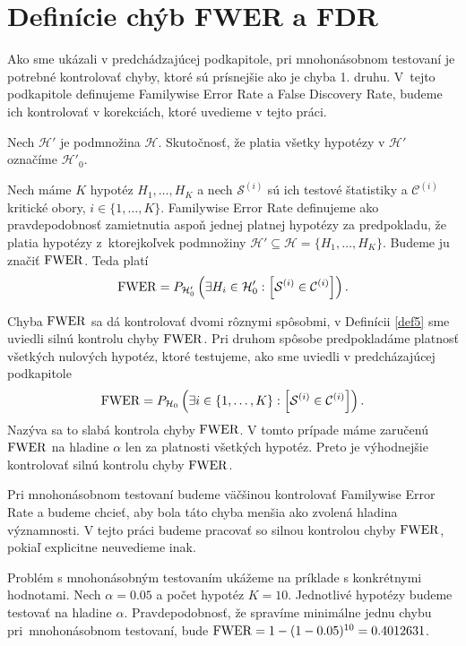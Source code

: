\section{Definície chýb FWER a FDR}

Ako sme ukázali v predchádzajúcej podkapitole, pri mnohonásobnom testovaní 
je potrebné kontrolovať chyby, ktoré sú prísnejšie ako je chyba 1. druhu. 
V~tejto podkapitole definujeme Familywise Error Rate a False Discovery Rate, 
budeme ich kontrolovať v korekciách, ktoré uvedieme v tejto práci. 

Nech $\mathcal{H}'$ je podmnožina $\mathcal{H}$. 
Skutočnosť, že platia všetky hypotézy v $\mathcal{H}'$ označíme ${\mathcal{H}}'_0$. 

\begin{definicia}\label{def5} 
  Nech máme $K$ hypotéz $H_1, \dots, H_K$ a nech $\mathcal{S}^{(i)}$ sú ich testové štatistiky 
  a $\mathcal{C}^{(i)}$ kritické obory, $i \in \{1, \dots, K\}$. 
  Familywise Error Rate definujeme ako pravdepodobnosť zamietnutia aspoň jednej platnej hypotézy za predpokladu, 
  že platia hypotézy z~ktorejkoľvek podmnožiny $\mathcal{H}' \subseteq \mathcal{H} = \{ H_1, \dots, H_K \}$.  
  Budeme ju značiť ${\rm FWER}$. 
  Teda platí 
  $$ {\rm FWER} = P_{\mathcal{H}'_0} \left( \exists H_i \in {\mathcal{H}}'_0: \left[ \mathcal{S}^{(i)} \in \mathcal{C}^{(i)} \right] \right). $$
\end{definicia}

Chyba ${\rm FWER}$ sa dá kontrolovať dvomi rôznymi spôsobmi, 
v Definícii \ref{def5} sme uviedli silnú kontrolu chyby ${\rm FWER}$. 
Pri druhom spôsobe predpokladáme platnosť všetkých nulových hypotéz, ktoré testujeme, 
ako sme uviedli v predcházajúcej podkapitole 
$$ {\rm FWER} = P_{\mathcal{H}_0} \left( \exists i \in \{1, \dots, K\}: \left[ \mathcal{S}^{(i)} \in \mathcal{C}^{(i)} \right] \right). $$
Nazýva sa to slabá kontrola chyby ${\rm FWER}$. 
V tomto prípade máme zaručenú ${\rm FWER}$ na hladine $\alpha$ len za platnosti všetkých hypotéz. 
Preto je výhodnejšie kontrolovať silnú kontrolu chyby ${\rm FWER}$. 

Pri mnohonásobnom testovaní budeme väčšinou kontrolovať Familywise Error Rate a budeme chcieť, 
aby bola táto chyba menšia ako zvolená hladina významnosti. 
V tejto práci budeme pracovať so silnou kontrolou chyby ${\rm FWER}$, 
pokiaľ explicitne neuvedieme inak.  

Problém s mnohonásobným testovaním ukážeme na príklade s konkrétnymi hodnotami. 
Nech $\alpha = 0.05$ a počet hypotéz $K = 10$. Jednotlivé hypotézy budeme testovať na hladine $\alpha$. 
Pravdepodobnosť, že spravíme minimálne jednu chybu pri~mnohonásobnom testovaní, 
bude ${\rm FWER} = 1 - (1 - 0.05)^{10} = 0.4012631$. 

